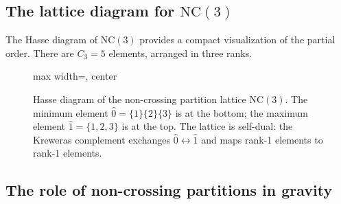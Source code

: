\documentclass[11pt,letterpaper]{article}
\theoremstyle{plain}
\theoremstyle{definition}
\theoremstyle{remark}
\begin{document}
\subsection{The lattice diagram for \texorpdfstring{$\mathrm{NC}(3)$}{NC(3)}}

The Hasse diagram of $\mathrm{NC}(3)$ provides a compact visualization of the
partial order.  There are $C_3 = 5$ elements, arranged in three ranks.

\begin{figure}[!htbp]
\centering
\begin{adjustbox}{max width=\textwidth, center}
\end{adjustbox}
\caption{Hasse diagram of the non-crossing partition lattice $\mathrm{NC}(3)$.
The minimum element $\hat{0} = \{1\}\{2\}\{3\}$ is at the bottom; the maximum
element $\hat{1} = \{1,2,3\}$ is at the top.  The lattice is self-dual: the
Kreweras complement exchanges $\hat{0} \leftrightarrow \hat{1}$ and maps rank-1
elements to rank-1 elements.}
\label{fig16:nc3_lattice}
\end{figure}

\subsection{The role of non-crossing partitions in gravity}
\end{document}
